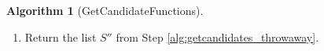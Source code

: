 \documentclass{dcthesis}
\newcommand{\ZZ}{\mathbb Z}
\newcommand{\mm}[1]{{\color{blue} \sf MM: [#1]}}
\newcommand{\wt}[1]{\widetilde{#1}}
\newcommand{\LL}{\mathscr L}
\newcommand{\FF}{\mathbb{F}}
\DeclareMathOperator{\Div}{Div}
\DeclareMathOperator{\Gal}{Gal}
\numberwithin{equation}{section}
\theoremstyle{definition}
\newtheorem{alg}[equation]{Algorithm}
\theoremstyle{remark}
\begin{document}
{{{\begin{alg}[GetCandidateFunctions]
\begin{enumerate}
\begin{itemize}
          \item
            If $S$ is nonempty,
            then
            for each $f_a\in S$
            compute
            $F(\sqrt{f_a})$,
            \[
              G_a\cong\Gal(F(\sqrt{f_a})\,|\,\FF_q(x)),
            \]
            and let
            $S''=
            \{f_a\in S:G_a\cong\wt{G}\}$.
          \item
            If $S$ is empty,
            then
            for each $f_a\in S'$
            compute
            $F'(\sqrt{f_a})$,
            \[
              G_a\cong\Gal(F'(\sqrt{f_a})\,|\,\FF_{q^2}(x)),
            \]
            and let
            $S''=
            \{f_a\in S':G_a\cong\wt{G}\}$.
        \end{itemize}
        \item\label{alg:getcandidates_return}
          Return the list $S''$ from
          Step
          \ref{alg:getcandidates_throwaway}.
      \end{enumerate}

\end{alg}}}}
\end{document}
